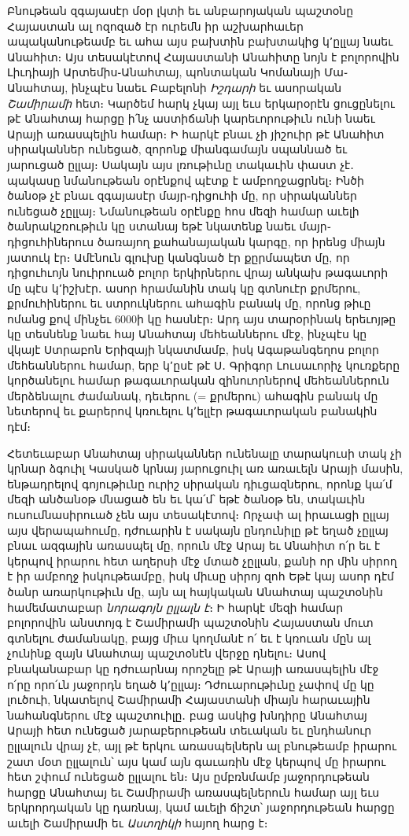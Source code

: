 \documentclass{article}
\begin{document}
{Բնութեան զգայասէր մօր լկտի եւ անբարոյական պաշտօնը Հայաստան ալ ոզոզած էր ուրեմն իր աշխարհաւեր ապականութեամբ եւ ահա այս բախտին բախտակից կ՚ըլլայ նաեւ Անահիտ։ Այս տեսակէտով Հայաստանի Անահիտը նոյն է բոլորովին Լիւդիայի Արտեմիս֊Անահտայ, պոնտական Կոմանայի Մա֊Անահտայ, ինչպէս նաեւ Բաբելոնի \emph{Իշդարի} եւ ասորական \emph{Շամիրամի} հետ։ Կարծեմ հարկ չկայ այլ եւս երկարօրէն ցուցընելու թէ Անահտայ հարցը ի՛նչ աստիճանի կարեւորութիւն ունի նաեւ Արայի առասպելին համար։ Ի հարկէ բնաւ չի յիշուիր թէ Անահիտ սիրականներ ունեցած, զորոնք միանգամայն սպաննած եւ յարուցած ըլլայ։ Սակայն այս լռութիւնը տակաւին փաստ չէ․ պակասը նմանութեան օրէնքով պէտք է ամբողջացրնել։ Ինծի ծանօթ չէ բնաւ զգայասէր մայր֊դիցուհի մը, որ սիրականներ ունեցած չըլլայ։ Նմանութեան օրէնքը հոս մեզի համար աւելի ծանրակշռութիւն կը ստանայ եթէ նկատենք նաեւ մայր֊դիցուհիներուս ծառայող քահանայական կարգը, որ իրենց միայն յատուկ էր։ Ամէնուն գլուխը կանգնած էր քըրմապետ մը, որ դիցուհւոյն նուիրուած բոլոր երկիրներու վրայ անկախ թագաւորի մը պէս կ՚իշխէր․ ասոր հրամանին տակ կը գտնուէր քրմերու, քրմուհիներու եւ ստրուկներու ահագին բանակ մը, որոնց թիւը ոմանց քով մինչեւ 6000ի կը հասնէր։ Արդ այս տարօրինակ երեւոյթը կը տեսնենք նաեւ հայ Անահտայ մեհեաններու մէջ, ինչպէս կը վկայէ Ստրաբոն Երիզայի նկատմամբ, իսկ Ագաթանգեղոս բոլոր մեհեաններու համար, երբ կ՚ըսէ թէ Ս․ Գրիգոր Լուսաւորիչ կուռքերը կործանելու համար թագաւորական զինուորներով մեհեաններուն մերձենալու ժամանակ, դեւերու (= քրմերու) ահագին բանակ մը նետերով եւ քարերով կռուելու կ՚ելլէր թագաւորական բանակին դէմ։

Հետեւաբար Անահտայ սիրականներ ունենալը տարակուսի տակ չի կրնար ձգուիլ Կասկած կրնայ յարուցուիլ առ առաւելն Արայի մասին, ենթադրելով գոյութիւնը ուրիշ սիրական դիւցազներու, որոնք կա՛մ մեզի անծանօթ մնացած են եւ կա՛մ՝ եթէ ծանօթ են, տակաւին ուսումնասիրուած չեն այս տեսակէտով։ Որչափ ալ իրաւացի ըլլայ այս վերապահումը, դժուարին է սակայն ընդունիլը թէ եղած չըլլայ բնաւ ազգային առասպել մը, որուն մէջ Արայ եւ Անահիտ ո՛ր եւ է կերպով իրարու հետ աղերսի մէջ մտած չըլլան, քանի որ մին սիրող է իր ամբողջ իսկութեամբը, իսկ միւսը սիրոյ զոհ Եթէ կայ ասոր դէմ ծանր առարկութիւն մը, այն ալ հայկական Անահտայ պաշտօնին համեմատաբար \emph{նորագոյն ըլլալն է}։ Ի հարկէ մեզի համար բոլորովին անստոյգ է Շամիրամի պաշտօնին Հայաստան մուտ գտնելու ժամանակը, բայց միւս կողմանէ ո՛ եւ է կռուան մըն ալ չունինք զայն Անահտայ պաշտօնէն վերջը դնելու։ Ասով բնականաբար կը դժուարնայ որոշելը թէ Արայի առասպելին մէջ ո՛րը որո՛ւն յաջորդն եղած կ՚ըլլայ։ Դժուարութիւնը չափով մը կը լուծուի, նկատելով Շամիրամի Հայաստանի միայն հարաւային նահանգներու մէջ պաշտուիլը․ բաց ասկից խնդիրը Անահտայ Արայի հետ ունեցած յարաբերութեան տեւական եւ ընդհանուր ըլլալուն վրայ չէ, այլ թէ երկու առասպելներն ալ բնութեամբ իրարու շատ մօտ ըլլալուն՝ այս կամ այն գաւառին մէջ կերպով մը իրարու հետ շփում ունեցած ըլլալու են։ Այս ըմբռնմամբ յաջորդութեան հարցը Անահտայ եւ Շամիրամի առասպելներուն համար այլ եւս երկրորդական կը դառնայ, կամ աւելի ճիշտ՝ յաջորդութեան հարցը աւելի Շամիրամի եւ \emph{Աստղիկի} հայող հարց է։

}
\end{document}
